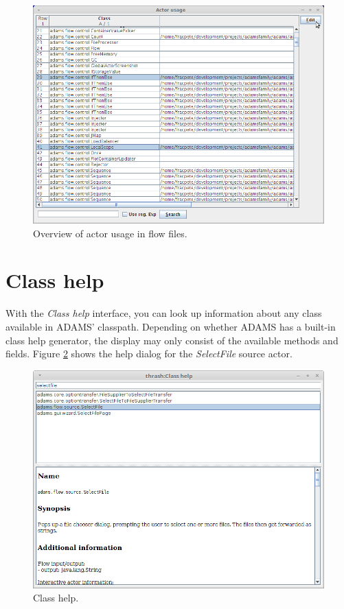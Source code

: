\begin{figure}[htb]
  \centering
  \includegraphics[width=12.0cm]{images/actor_usage.png}
  \caption{Overview of actor usage in flow files.}
  \label{actor_usage}
\end{figure}

\newpage
\section{Class help}
With the \textit{Class help} interface, you can look up information about
any class available in ADAMS' classpath. Depending on whether ADAMS has a
built-in class help generator, the display may only consist of the available
methods and fields. Figure \ref{classhelp} shows the help dialog for the
\textit{SelectFile} source actor.

\begin{figure}[htb]
  \centering
  \includegraphics[width=12.0cm]{images/classhelp.png}
  \caption{Class help.}
  \label{classhelp}
\end{figure}

